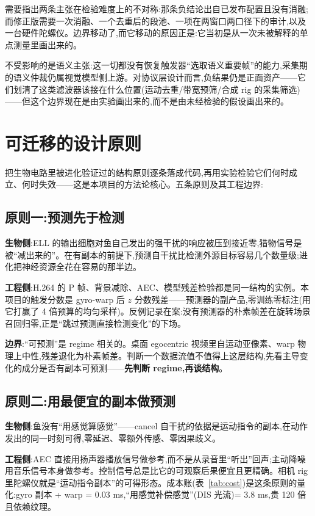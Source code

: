 \documentclass[UTF8,12pt,a4paper]{ctexart}
\begin{document}
需要指出两条主张在检验难度上的不对称:那条负结论出自已发布配置且没有消融;而修正版需要一次消融、一个去重后的段池、一项在两窗口两口径下的审计,以及一台硬件陀螺仪。边界移动了,而它移动的原因正是:它当初是从一次未被解释的单点测量里画出来的。

不受影响的是语义主张:这一切都没有恢复触发器``选取语义重要帧''的能力,采集期的语义仲裁仍属视觉模型侧上游。对协议层设计而言,负结果仍是正面资产——它们划清了这类滤波器该接在什么位置(运动去重/带宽预筛/合成 rig 的采集筛选)——但这个边界现在是由实验画出来的,而不是由未经检验的假设画出来的。

\section{可迁移的设计原则}

把生物电路里被进化验证过的结构原则逐条落成代码,再用实验检验它们何时成立、何时失效——这是本项目的方法论核心。五条原则及其工程边界:

\subsection{原则一:预测先于检测}

\textbf{生物侧}:ELL 的输出细胞对鱼自己发出的强干扰的响应被压到接近零,猎物信号是被``减出来的''。在有副本的前提下,预测自干扰比检测外源目标容易几个数量级;进化把神经资源全花在容易的那半边。

\textbf{工程侧}:H.264 的 P 帧、背景减除、AEC、模型残差检验都是同一结构的实例。本项目的触发分数是 gyro-warp 后 $z$ 分数残差——预测器的副产品,零训练零标注(用它打赢了 4 倍预算的均匀采样)。反例记录在案:没有预测器的朴素帧差在旋转场景召回归零,正是``跳过预测直接检测变化''的下场。

\textbf{边界}:``可预测''是 regime 相关的。桌面 egocentric 视频里自运动亚像素、warp 物理上中性,残差退化为朴素帧差。判断一个数据流值不值得上这层结构,先看主导变化的成分是否有副本可预测——\textbf{先判断 regime,再谈结构}。

\subsection{原则二:用最便宜的副本做预测}

\textbf{生物侧}:鱼没有``用感觉算感觉''——cancel 自干扰的依据是运动指令的副本,在动作发出的同一时刻可得,零延迟、零额外传感、零因果歧义。

\textbf{工程侧}:AEC 直接用扬声器播放信号做参考,而不是从录音里``听出''回声;主动降噪用音乐信号本身做参考。控制信号总是比它的可观察后果便宜且更精确。相机 rig 里陀螺仪就是``运动指令副本''的可得形态。成本账(表~\ref{tab:cost})是这条原则的量化:gyro 副本 + warp = 0.03 ms,``用感觉补偿感觉''(DIS 光流)= 3.8 ms,贵 120 倍且依赖纹理。
\end{document}
